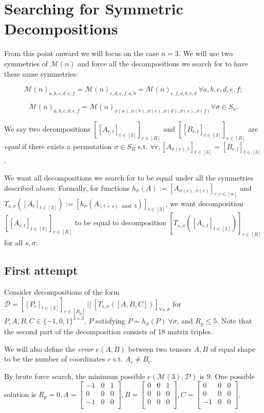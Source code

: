 \documentclass{article}
\begin{document}
\section{Searching for Symmetric Decompositions}
From this point onward we will focus on the case $n=3$. We will use two symmetries of $\mathcal{M}(n)$ and force all the decompositions we search for to have these same symmetries:

\[\mathcal{M}(n)_{a,b,c,d,e,f}=\mathcal{M}(n)_{c,d,e,f,a,b}=\mathcal{M}(n)_{e,f,a,b,c,d}\ \forall a,b,c,d,e,f;\]

\[\mathcal{M}(n)_{a,b,c,d,e,f}=\mathcal{M}(n)_{\sigma(a),\sigma(b),\sigma(c),\sigma(d),\sigma(e),\sigma(f)} \forall \sigma\in S_n.\]

We say two decompositions $[[A_{r,t}]_{t\in[3]}]_{r\in[R]}$ and $[[B_{r,t}]_{t\in[3]}]_{r\in[R]}$ are \textit{equal} if there exists a permutation $\sigma\in S_R$ s.t. $\forall r, [A_{\sigma(r),t}]_{t\in[3]}=[B_{r,t}]_{t\in[3]}$.

We want all decompositions we search for to be equal under all the symmetries described above. Formally, for functions
$h_{\sigma}(A):=[A_{\sigma(r),\sigma(c)}]_{r,c\in[n]}$ and $T_{s,\sigma}([A_t]_{t\in[3]}):=[h_{\sigma}(A_{(t+s)\mod 3})]_{t\in[3]}$, we want decomposition $[[A_{r,t}]_{t\in[3]}]_{r\in[R]}$ to be equal to decomposition $[T_{s,\sigma}([A_{r,t}]_{t\in[3]})]_{r\in[R]}$ for all $s,\sigma$.

\subsection{First attempt}
Consider decompositions of the form $\mathcal{D}=[[P_r]_{t\in[3]}]_{r\in[R_p]}\ ||\ [T_{s,\sigma}([A,B,C])]_{\forall s,\sigma}$ for $P,A,B,C\in\{-1,0,1\}^{3\times 3}$, $P$ satisfying $P=h_\sigma(P)\ \forall\sigma$, and $R_p\le 5$. Note that the second part of the decomposition consists of 18 matrix triples.

We will also define the \textit{error} $e(A,B)$ between two tensors $A,B$ of equal shape to be the number of coordinates $c$ s.t. $A_c\ne B_c$.

By brute force search, the minimum possible $e(\mathcal{M}(3),\mathcal{D})$ is 9. One possible solution is $R_p=0,
A=\begin{bmatrix}
-1 & 0 & 1\\
0 & 0 & 0\\
-1 & 0 & 0\\
\end{bmatrix},
B=\begin{bmatrix}
0 & 0 & 1\\
0 & 0 & 0\\
0 & 0 & 0\\
\end{bmatrix},
C=\begin{bmatrix}
0 & 0 & 0\\
0 & 0 & 0\\
-1 & 0 & 0\\
\end{bmatrix}$.
\end{document}
